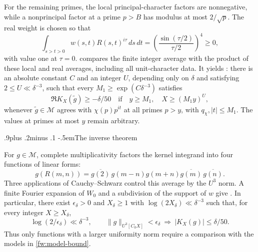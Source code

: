 \documentclass[twoside]{aomart}
\makeatletter
\theoremstyle{paperplain}
\theoremstyle{paperdefinition}
\renewcommand\subsection{\@startsection{subsection}{2}{\z@}
  {.9\baselineskip plus .2\baselineskip minus .1\baselineskip}
  {-.5em}{\normalfont\bfseries}}
\numberwithin{equation}{section}
\makeatother
\begin{document}
For the remaining primes, the local principal-character factors
are nonnegative, while a nonprincipal factor at a prime $p>B$
has modulus at most $2/\sqrt p$. The real weight is chosen so that
\begin{equation*}
 \int_{s>t>0}w(s,t)R(s,t)^{i\tau}\,ds\,dt
 =\left(\frac{\sin(\tau/2)}{\tau/2}\right)^4\ge0,
\end{equation*}
with value one at $\tau=0$.
 compares the finite integer average with the
product of these local and real averages, including all unit-character
data. It yields : there is an absolute
constant $C$ and an integer $U$, depending only on $\delta$ and
satisfying $2\le U\ll\delta^{-3}$, such that every
$M_1\ge\exp(C\delta^{-3})$ satisfies
\begin{equation}
 \Re K_X(\widetilde g)\ge-\delta/50
 \quad\text{if}\quad y\ge M_1,\quad X\ge(M_1y)^U,
 \label{fw:model-bound}
\end{equation}
whenever $\widetilde g\in\mathcal M$ agrees with
$\chi(p)p^{it}$ at all primes $p>y$, with $q_\chi,|t|\le M_1$.
The values at primes at most $y$ remain arbitrary.

\subsection{The inverse theorem}

For $g\in\mathcal M$, complete multiplicativity factors the kernel
integrand into four functions of linear forms:
\begin{equation}
 g(R(m,n))=\overline{g(2)}\,
 g(m-n)g(m+n)\overline{g(m)}\,\overline{g(n)}.
 \label{fw:four-forms}
\end{equation}
Three applications of Cauchy--Schwarz control this average by the
$U^3$ norm. A finite Fourier expansion of $W_0$ and a subdivision
of the support of $w$ give . In particular,
there exist $\epsilon_\delta>0$ and $X_\delta\ge1$ with
$\log(2X_\delta)\ll\delta^{-3}$ such that, for every integer
$X\ge X_\delta$,
\begin{equation}
 \log(2/\epsilon_\delta)\ll\delta^{-3},\qquad
 \|g\|_{U^3[C_0X]}<\epsilon_\delta
 \ \Longrightarrow\ |K_X(g)|\le\delta/50.
 \label{fw:uniform-alternative}
\end{equation}
Thus only functions with a larger uniformity norm require a
comparison with the models in \eqref{fw:model-bound}.
\end{document}
